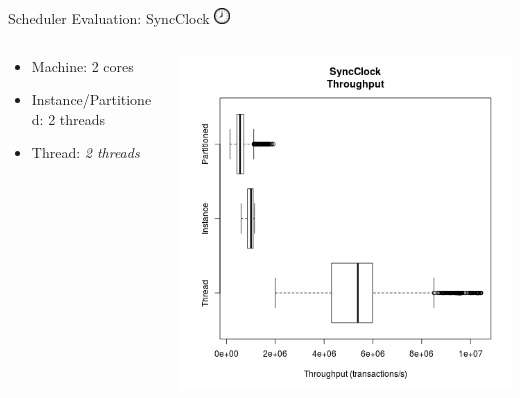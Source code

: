 \documentclass{beamer}
\begin{document}
\begin{frame}{Scheduler Evaluation: SyncClock \includegraphics[height=12pt]{CLOCK01-300px.png}}

    \begin{columns}
    \begin{column}{.4\textwidth}
      \begin{itemize}
      \item Machine:  2 cores
      \item Instance/Partitioned:  2 threads
      \item Thread:  \emph{2 threads}
      \end{itemize}
    \end{column}
    \begin{column}{.6\textwidth}
      \includegraphics[width=.6\textheight]{sync_throughput_box.png}
    \end{column}
  \end{columns}

  \vspace*{12pt}


\end{frame}
\end{document}
